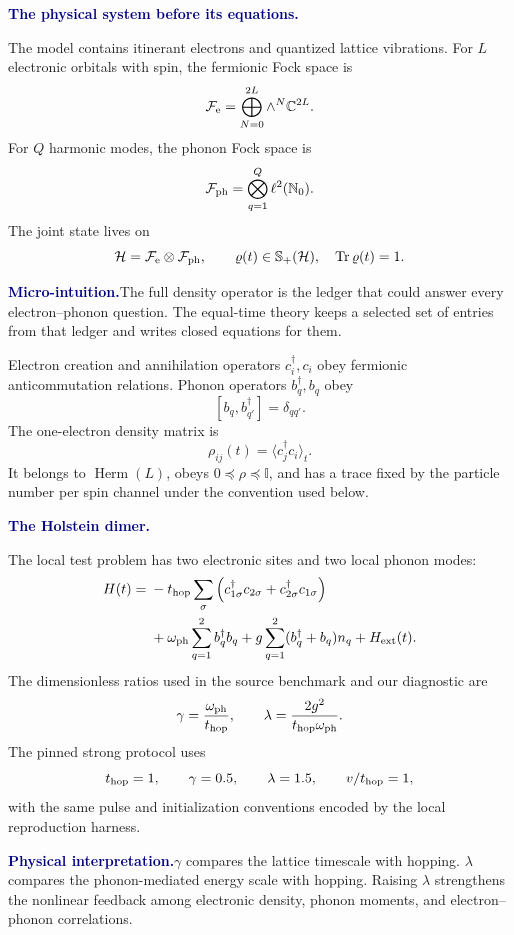 \documentclass[10pt]{article}
\newcommand{\Tr}{\operatorname{Tr}}
\newcommand{\Herm}{\operatorname{Herm}}
\newcommand{\PSD}{\mathbb S_{+}}
\newcommand{\C}{\mathbb C}
\newcommand{\I}{\mathbb I}
\newcommand{\pedbox}[2]{%
  \par\medskip
  \noindent\colorbox{pale}{%
    \parbox{\dimexpr\linewidth-2\fboxsep\relax}{%
      \textcolor{navy}{\textbf{#1}}\quad #2%
    }%
  }\par\medskip
}
\newcommand{\intuition}[1]{\pedbox{Micro-intuition.}{#1}}
\newcommand{\physicalbox}[1]{\pedbox{Physical interpretation.}{#1}}
\newcommand{\flowlead}[1]{%
  \par\medskip
  \needspace{3\baselineskip}%
  \noindent\textcolor{navy}{\textbf{#1.}}\enspace\ignorespaces
}
\begin{document}
\flowlead{The physical system before its equations}

The model contains itinerant electrons and quantized lattice vibrations.
For \(L\) electronic orbitals with spin, the fermionic Fock space is
\[
\mathcal F_{\rm e}
=\bigoplus_{N=0}^{2L}\wedge^N\C^{2L}.
\]
For \(Q\) harmonic modes, the phonon Fock space is
\[
\mathcal F_{\rm ph}
=\bigotimes_{q=1}^{Q}\ell^2(\mathbb N_0).
\]
The joint state lives on
\[
\mathcal H=\mathcal F_{\rm e}\otimes\mathcal F_{\rm ph},
\qquad
\varrho(t)\in\PSD(\mathcal H),\quad \Tr\varrho(t)=1.
\]

\intuition{The full density operator is the ledger that could answer every
electron--phonon question.  The equal-time theory keeps a selected set of
entries from that ledger and writes closed equations for them.}

Electron creation and annihilation operators \(c_i^\dagger,c_i\) obey
fermionic anticommutation relations.  Phonon operators
\(b_q^\dagger,b_q\) obey
\[
[b_q,b_{q'}^\dagger]=\delta_{qq'}.
\]
The one-electron density matrix is
\[
\rho_{ij}(t)=\langle c_j^\dagger c_i\rangle_t.
\]
It belongs to \(\Herm(L)\), obeys \(0\preceq\rho\preceq\I\), and has a trace
fixed by the particle number per spin channel under the convention used
below.

\flowlead{The Holstein dimer}

The local test problem has two electronic sites and two local phonon modes:
\[
\begin{aligned}
H(t)
={}&-t_{\rm hop}\sum_\sigma
\left(c_{1\sigma}^\dagger c_{2\sigma}
      +c_{2\sigma}^\dagger c_{1\sigma}\right)\\
&+\omega_{\rm ph}\sum_{q=1}^{2}b_q^\dagger b_q
+g\sum_{q=1}^{2}(b_q^\dagger+b_q)n_q
+H_{\rm ext}(t).
\end{aligned}
\]
The dimensionless ratios used in the source benchmark and our diagnostic are
\[
\gamma=\frac{\omega_{\rm ph}}{t_{\rm hop}},
\qquad
\lambda=\frac{2g^2}{t_{\rm hop}\omega_{\rm ph}}.
\]
The pinned strong protocol uses
\[
t_{\rm hop}=1,\qquad \gamma=0.5,\qquad
\lambda=1.5,\qquad v/t_{\rm hop}=1,
\]
with the same pulse and initialization conventions encoded by the local
reproduction harness.

\physicalbox{\(\gamma\) compares the lattice timescale with hopping.
\(\lambda\) compares the phonon-mediated energy scale with hopping.  Raising
\(\lambda\) strengthens the nonlinear feedback among electronic density,
phonon moments, and electron--phonon correlations.}
\end{document}
